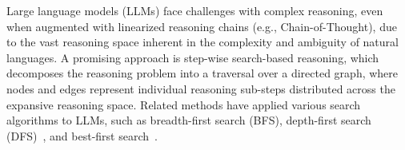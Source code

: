 






Large language models (LLMs) face challenges with complex reasoning, even when augmented with linearized reasoning chains (e.g., Chain-of-Thought), due to the vast reasoning space inherent in the complexity and ambiguity of natural languages.
A promising approach is step-wise search-based reasoning, which decomposes the reasoning problem into a traversal over a directed graph, where nodes and edges represent individual reasoning sub-steps distributed across the expansive reasoning space.
Related methods have applied various search algorithms to LLMs, such as breadth-first search (BFS), depth-first search (DFS)~\cite{yao2024tree,besta2024graph}, and best-first search~\cite{hao-etal-2023-reasoning,zhang2024accessinggpt4levelmathematical,qi2024mutual}.

